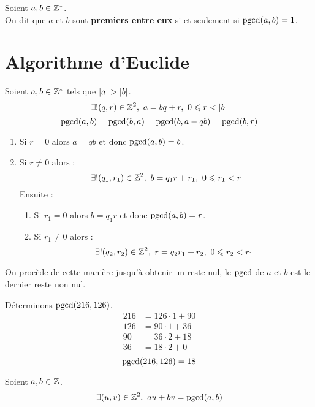 \begin{definition}
	Soient $a, b \in \mathbb{Z}^*$. 
	\\	
	On dit que $a$ et $b$ sont \textbf{premiers entre eux} si et seulement si $\operatorname{pgcd}(a, b) = 1$.
\end{definition}

\section{Algorithme d'Euclide}
\begin{proposition}
	Soient $a, b \in \mathbb{Z}^*$ tels que $\abs{a} > \abs{b}$.
	\[ \exists ! (q, r) \in \mathbb{Z}^2,\ a = bq + r,\ 0 \leqslant r < \abs{b} \]
	\[ \operatorname{pgcd}(a, b) = \operatorname{pgcd}(b, a) = \operatorname{pgcd}(b, a - qb) = \operatorname{pgcd}(b, r) \]
	\begin{enumerate}
		\item Si $r = 0$ alors $a = qb$ et donc $\operatorname{pgcd}(a, b) = b$.
		\item Si $r \neq 0$ alors :
		\[ \exists ! (q_1, r_1) \in \mathbb{Z}^2,\ b = q_1 r + r_1,\ 0 \leqslant r_1 < r \]
		Ensuite : 
		\begin{enumerate}
			\item Si $r_1 = 0$ alors $b = q_1 r$ et donc $\operatorname{pgcd}(a, b) = r$.
			\item Si $r_1 \neq 0$ alors :
			\[ \exists ! (q_2, r_2) \in \mathbb{Z}^2,\ r = q_2 r_1 + r_2,\ 0 \leqslant r_2 < r_1 \]
		\end{enumerate}
	\end{enumerate}
	
	On procède de cette manière jusqu'à obtenir un reste nul, le $\operatorname{pgcd}$ de $a$ et $b$ est le dernier reste non nul.
\end{proposition}

\begin{example}
	Déterminons $\operatorname{pgcd}(216, 126)$.
	\begin{align*}
		216 &= 126 \cdot 1 + 90 \\
		126 &= 90 \cdot 1 + 36 \\
		90  &= 36 \cdot 2 + 18 \\
		36  &= 18 \cdot 2 + 0
	\end{align*}
	\[ \operatorname{pgcd}(216, 126) = 18 \]
\end{example}

\begin{theorem}
	Soient $a, b \in \mathbb{Z}$.
	\[ \exists (u, v) \in \mathbb{Z}^2,\ au + bv = \operatorname{pgcd}(a, b) \]
\end{theorem}

